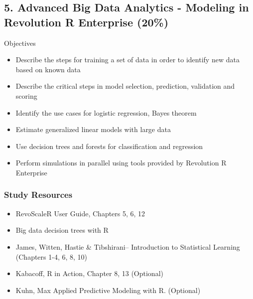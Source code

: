 \documentclass[]{article}
\begin{document}
	\subsection*{5. Advanced Big Data Analytics - Modeling in Revolution R Enterprise (20\%)}
	
	Objectives
	\begin{itemize}
		\item Describe the steps for training a set of data in order to identify new data based on known data
		\item Describe the critical steps in model selection, prediction, validation and scoring
		\item Identify the use cases for logistic regression, Bayes theorem
		\item Estimate generalized linear models with large data
		\item Use decision trees and forests for classification and regression
		\item Perform simulations in parallel using tools provided by Revolution R Enterprise
	\end{itemize}
\subsubsection*{Study Resources}
	\begin{itemize}
		\item RevoScaleR User Guide, Chapters 5, 6, 12
		\item Big data decision trees with R
		\item James, Witten, Hastie \& Tibshirani– Introduction to Statistical Learning (Chapters 1-4, 6, 8, 10)
		\item Kabacoff, R in Action, Chapter 8, 13 (Optional)
		\item Kuhn, Max Applied Predictive Modeling with R. (Optional)
	\end{itemize}
\end{document}
